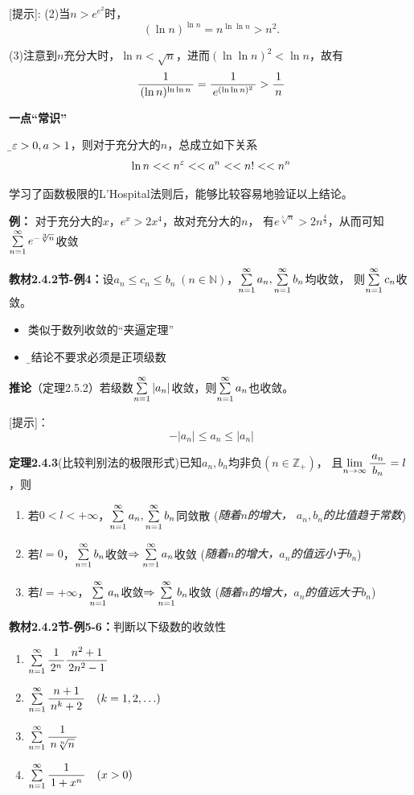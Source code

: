 [提示]: (2)\;当$n>e^{e^2}$时，
$$(\ln n)^{\ln n}=n^{\ln\ln n}>n^2.$$

(3)\;注意到$n$充分大时，$\ln n<\sqrt{n}$，进而$(\ln\ln n)^2<\ln n$，故有
  $$\displaystyle\frac{\,{1}\,}{\,{(\ln n)^{\ln\ln n}}\,}=\displaystyle\frac{\,{1}\,}{\,{e^{(\ln\ln
  n)^2}}\,}>\displaystyle\frac{\,{1}\,}{\,{n}\,}$$

\begin{shaded}
	{\bf 一点“常识”}
	
	{\b 设$\varepsilon>0, a>1$，则对于充分大的$n$，总成立如下关系
	$$\ln n<<n^{\varepsilon}<<a^n<<n!<<n^n$$}

	学习了函数极限的L'Hospital法则后，能够比较容易地验证以上结论。
	
	{\bf 例：} 对于充分大的$x$，$e^x>2x^4$，故对充分大的$n$，
	有$e^{\sqrt[3]n}>2n^{\frac 43}$，从而可知$\sum\limits_{n=1}^{\infty} e^{-\sqrt[3]n}$收敛
\end{shaded}

{\bf 教材2.4.2节-例4：}设$a_n\leq c_n\leq b_n\;(n\in\mathbb{N})$，$\sum\limits_{n=1}^{\infty} a_n,\sum\limits_{n=1}^{\infty}
b_n$均收敛， 则$\sum\limits_{n=1}^{\infty} c_n$收敛。
\begin{itemize}
  \setlength{\itemindent}{1cm}
  \item 类似于数列收敛的“夹逼定理”
  \item {\b 该结论不要求必须是正项级数}
\end{itemize}

{\bf 推论}（定理2.5.2）若级数$\sum\limits_{n=1}^{\infty}|a_n|$收敛，则$\sum\limits_{n=1}^{\infty} a_n$也收敛。

[提示]：
$$-|a_n|\leq a_n\leq|a_n|$$

{\bf 定理2.4.3}(比较判别法的极限形式)已知$a_n,b_n$均非负$(n\in\mathbb{Z}_+)$，
且$\lim\limits_{n\to\infty}\displaystyle\frac{\,{a_n}\,}{\,{b_n}\,}=l$，则 
\begin{enumerate}
  \setlength{\itemindent}{1cm}
  \item 若$0<l<+\infty$，$\sum\limits_{n=1}^{\infty} a_n,\sum\limits_{n=1}^{\infty} b_n$同敛散 \hfill({\it 随着$n$的增大，
  $a_n,b_n$的比值趋于常数})
  \item 若$l=0$，$\sum\limits_{n=1}^{\infty} b_n$收敛$\Rightarrow\sum\limits_{n=1}^{\infty} a_n$收敛 
  \hfill({\it 随着$n$的增大，$a_n$的值远小于$b_n$})
  \item 若$l=+\infty$，$\sum\limits_{n=1}^{\infty} a_n$收敛$\Rightarrow\sum\limits_{n=1}^{\infty} b_n$收敛
  \hfill({\it 随着$n$的增大，$a_n$的值远大于$b_n$})
\end{enumerate}

{\bf 教材2.4.2节-例5-6：}判断以下级数的收敛性
\begin{enumerate}[(1)]
  \setlength{\itemindent}{1cm}
  \item $\sum\limits_{n=1}^{\infty}\displaystyle\frac{\,{1}\,}{\,{2^n}\,}\displaystyle\frac{\,{n^2+1}\,}{\,{2n^2-1}\,}$ 
  \item $\sum\limits_{n=1}^{\infty}\displaystyle\frac{\,{n+1}\,}{\,{n^k+2}\,}\quad (k=1,2,\ldots)$ 
  \item $\sum\limits_{n=1}^{\infty}\displaystyle\frac{\,{1}\,}{\,{n\sqrt[n]{n}}\,}$ 
  \item $\sum\limits_{n=1}^{\infty}\displaystyle\frac{\,{1}\,}{\,{1+x^n}\,}\quad(x>0)$
\end{enumerate}

